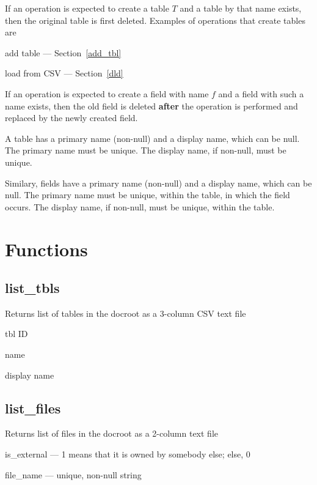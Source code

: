 \be
\item If an operation is expected to create a table \(T\) and a table
by that name exists, then the original table is first deleted. Examples
of operations that create tables are
\be
\item add table --- Section~\ref{add_tbl}
\item load from CSV --- Section~\ref{dld}
\ee
\item 
If an operation is expected to create a field with name \(f\) and a
field with such a name exists, then the old field is deleted {\bf after}
the operation is performed and replaced by the newly created field. 
\item 
A table has a primary name (non-null) and a display name, which can be
null. The primary name must be unique. The display name, if non-null,
must be unique. 
\item Similary, fields have a primary name (non-null) and a display
name, which can be null. 
The primary name must be unique, within the table, in which the field
occurs. The display name, if non-null, must be unique, within the table.
\ee


\section{Functions}

\subsection{list\_tbls}
\label{list_tbls}

Returns list of tables in the docroot as a 3-column CSV text file
\be
\item  tbl ID
\item name
\item display name
\ee

\subsection{list\_files}
\label{list_files}

Returns list of files in the docroot as a 2-column text file
\be
\item is\_external --- 1 means that it is owned by somebody else; else, 0
\item file\_name  --- unique, non-null string
\ee

